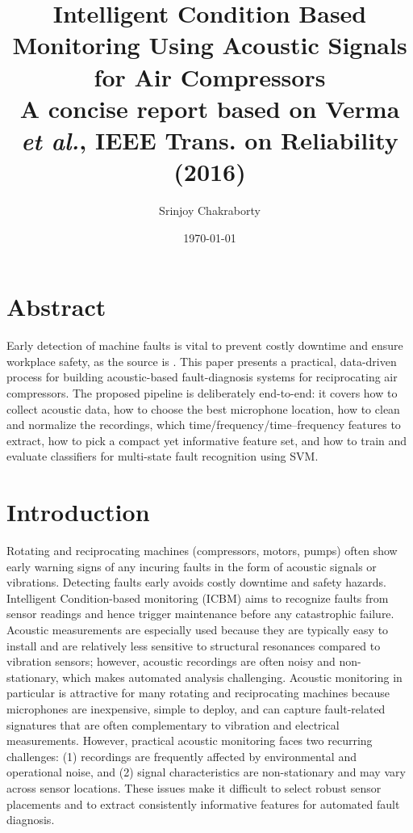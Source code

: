 \documentclass[12pt,a4paper]{article}
\title{Intelligent Condition Based Monitoring Using
Acoustic Signals for Air Compressors\\
\vspace{6pt}
\large A concise report based on Verma \textit{et al.}, IEEE Trans. on Reliability (2016)}
\author{Srinjoy Chakraborty}
\date{\today}
\begin{document}
\maketitle %
\newpage
\tableofcontents %
\listoffigures %
\newpage
\begin{multicols}{2}
\section{Abstract}
Early detection of machine faults is vital to prevent costly downtime and ensure workplace safety, as the source is \cite{Verma2016}. This paper presents a practical, data-driven process for building acoustic-based fault-diagnosis systems for reciprocating air compressors. The proposed pipeline is deliberately end-to-end: it covers how to collect acoustic data, how to choose the best microphone location, how to clean and normalize the recordings, which time/frequency/time–frequency features to extract, how to pick a compact yet informative feature set, and how to train and evaluate classifiers for multi-state fault recognition using SVM.
\section{Introduction}
Rotating and reciprocating machines (compressors, motors, pumps) often show early warning signs of any incuring faults in the form of acoustic signals or vibrations. Detecting faults early avoids costly downtime and safety hazards. Intelligent Condition-based monitoring (ICBM) aims to recognize faults from sensor readings and hence trigger maintenance before any catastrophic failure. Acoustic measurements are especially used because they are typically easy to install and are relatively less sensitive to structural resonances compared to vibration sensors; however, acoustic recordings are often noisy and non-stationary, which makes automated analysis challenging.
Acoustic monitoring in particular is attractive for many rotating and reciprocating machines because microphones are inexpensive, simple to deploy, and can capture fault-related signatures that are often complementary to vibration and electrical measurements. However, practical acoustic monitoring faces two recurring challenges: (1) recordings are frequently affected by environmental and operational noise, and (2) signal characteristics are non-stationary and may vary across sensor locations. These issues make it difficult to select robust sensor placements and to extract consistently informative features for automated fault diagnosis.


\end{multicols}
\end{document}
